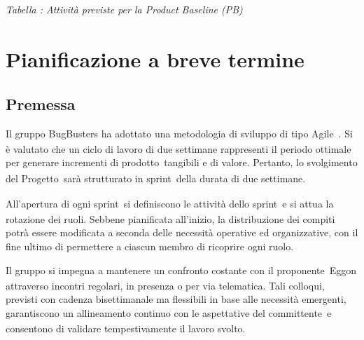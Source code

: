 \documentclass[a4paper,12pt]{article}
\newcommand{\pediceG}{\texorpdfstring{\textsubscript{\scalebox{0.6}{\textbf{G}}}~}{G}}
\begin{document}
{\begin{longtblr}[
  entry = {Attività previste per la PB},
  label = {tab:attivita-pb},
]
\end{longtblr}
 
\nopagebreak
\begin{center}
  \itshape Tabella \thetable: Attività previste per la Product Baseline (PB)\pediceG
\end{center}
 
\addtocounter{table}{-1}
 
}

\section{Pianificazione a breve termine}

\subsection{Premessa}
Il gruppo BugBusters ha adottato una metodologia di sviluppo di tipo Agile\pediceG. Si è valutato che un ciclo di lavoro di due settimane rappresenti il periodo ottimale per generare incrementi di prodotto\pediceG tangibili e di valore. Pertanto, lo svolgimento del Progetto\pediceG sarà strutturato in sprint\pediceG della durata di due settimane.

All'apertura di ogni sprint\pediceG si definiscono le attività dello sprint\pediceG e si attua la rotazione dei ruoli. Sebbene pianificata all'inizio, la distribuzione dei compiti potrà essere modificata a seconda delle necessità operative ed organizzative, con il fine ultimo di permettere a ciascun membro di ricoprire ogni ruolo.

Il gruppo si impegna a mantenere un confronto costante con il proponente\pediceG Eggon attraverso incontri regolari, in presenza o per via telematica. Tali colloqui, previsti con cadenza bisettimanale ma flessibili in base alle necessità emergenti, garantiscono un allineamento continuo con le aspettative del committente\pediceG e consentono di validare tempestivamente il lavoro svolto.
\end{document}
